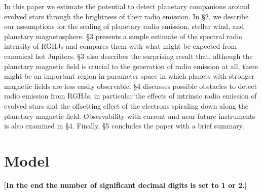 \documentclass{emulateapj}
\def\memoYF#1{\color{red}$[${\bf #1}$]$ \color{black}}
\begin{document}
In this paper we estimate the potential to detect planetary companions around evolved stars through the brightness of their radio emission.
In \S2, we describe our assumptions for the scaling of planetary radio emission, stellar wind, and planetary magnetosphere.
\S3 presents a simple estimate of the spectral radio intensity of RGHJs and compares them with what might be expected from canonical hot Jupiters.
\S3 also describes the surprising result that, although the planetary magnetic field is crucial to the generation of radio emission at all, there might be an important region in parameter space in which planets with stronger magnetic fields are less easily observable.
\S4 discusses possible obstacles to detect radio emission from RGHJs, in particular the effects of intrinsic radio emission of evolved stars and the offsetting effect of the electrons spiraling down along the planetary magnetic field.
Observability with current and near-future instruments is also examined in \S4. 
Finally, \S5 concludes the paper with a brief summary. 






\section{Model}
\label{s:assumptions}

\memoYF{In the end the number of significant decimal digits is set to 1 or 2.}
\end{document}

